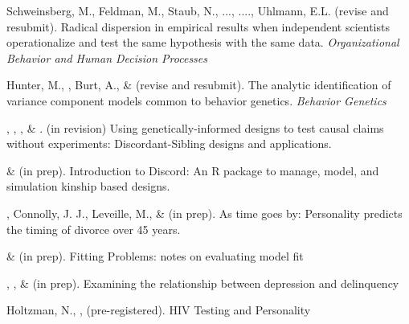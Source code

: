 \item Schweinsberg, M., Feldman, M., Staub, N., ..., \meb ...., Uhlmann, E.L. (revise and resubmit). Radical dispersion in empirical results when independent scientists operationalize and test the same hypothesis with the same data. \textit{Organizational Behavior and Human Decision Processes}

\item Hunter, M., \meb, Burt, A., \& \joe (revise and resubmit). The analytic identification of variance component models common to behavior genetics. \textit{Behavior Genetics}


\item \meb, \jt, \yrh, \& \joe. (in revision) Using genetically-informed designs to test causal claims without experiments: Discordant-Sibling designs and applications. \href{https://osf.io/zpdwt/}{\small\color{blue}{osf.io/zpdwt/}}%

\item \jt \& \meb (in prep). Introduction to Discord: An R package to manage, model, and simulation kinship based designs.

\item \meb, Connolly, J. J., Leveille, M., \& \jjj (in prep). As time goes by: Personality predicts the timing of divorce over 45 years.%

\item \meb \& \joe (in prep). Fitting Problems: notes on evaluating model fit
%
\item \emsims, \jt, \& \meb (in prep). Examining the relationship between depression and delinquency



\item Holtzman, N., \meb, \etal (pre-registered). HIV Testing and Personality


